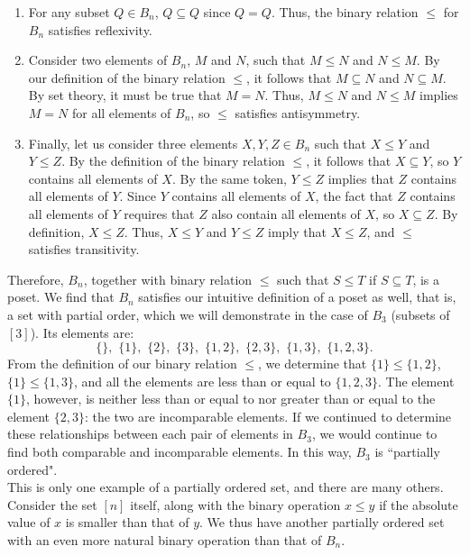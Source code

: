 \documentclass{article} %
\theoremstyle{definition}
\theoremstyle{plain}
\begin{document}
\begin{enumerate}
\item{For any subset $Q \in B_{n}$, $Q \subseteq Q$ since $Q=Q$. Thus, the binary relation $\leq$ for $B_n$ satisfies reflexivity.}
\item{Consider two elements of $B_n$, $M$ and $N$, such that $M \leq N$ and $N \leq M$. By our definition of the binary relation $\leq$, it follows that $M \subseteq N$ and $N \subseteq M$. By set theory,
it must be true that $M=N$. Thus, $M \leq N$ and $N \leq M$ implies $M=N$ for all elements of $B_{n}$, so $\leq$ satisfies antisymmetry.}
\item{Finally, let us consider three elements $X, Y, Z \in B_n$ such that $X \leq Y$ and $Y \leq Z$. %
By the definition of the binary relation $\leq$, it follows that $X \subseteq Y$, so $Y$ contains all elements of $X$. By the same token, $Y \leq Z$ implies that $Z$ contains all elements of $Y$. Since $Y$ contains all elements of $X$, the fact that $Z$ contains all elements of $Y$ requires that $Z$ also contain all elements of $X$, so $X\subseteq Z$. By definition, $X\leq Z$. Thus, $X \leq Y$ and $Y \leq Z$ imply that $X\leq Z$, and $\leq$ satisfies transitivity.}
\end{enumerate}
Therefore, $B_n$, together with binary relation $\leq$ such that $S \leq T$ if $S \subseteq T$, is a poset. We find that $B_n$ satisfies our intuitive definition of a poset as well, that is, a set with partial order, which we will demonstrate in the case of $B_3$ (subsets of $[3]$). Its elements are:
\[
\{\}, \, \, \{1\}, \, \, \{2\}, \, \, \{3\}, \, \, \{1,2\}, \, \, \{2,3\}, \, \, \{1,3\}, \, \, \{1,2,3\}.
\] 
From the definition of our binary relation $\leq$, we determine that $\{1\} \leq \{1,2\}$, $\{1\} \leq \{1,3\}$, and all the elements are less than or equal to $\{1,2,3\}$. The element $\{1\}$, however, is neither less than or equal to nor greater than or equal to the element $\{2,3\}$: the two are incomparable elements. If we continued to determine these relationships between each pair of elements in $B_3$, we would continue to find both comparable and incomparable elements. In this way, $B_{3}$ is ``partially ordered". \\

This is only one example of a partially ordered set, and there are many others. Consider the set $[n]$ itself, along with the binary operation $x \leq y$ if the absolute value of $x$ is smaller than that of $y$. We thus have another partially ordered set with an even more natural binary operation than that of $B_{n}$. 
\end{document}
